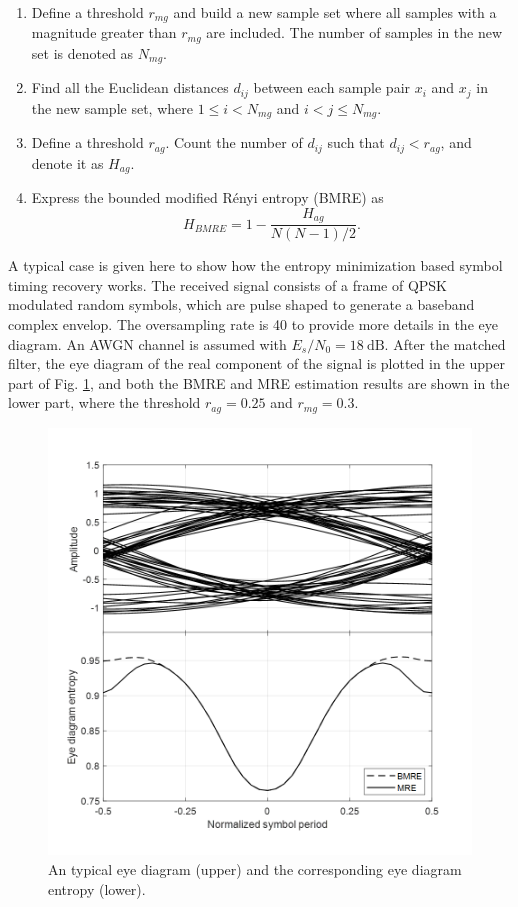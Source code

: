 \documentclass[journal,comsoc]{IEEEtran}
\begin{document}
\begin{enumerate}
\item Define a threshold \(r_{mg}\) and build a new sample set where all samples with a magnitude greater than \(r_{mg}\) are included.
The number of samples in the new set is denoted as \(N_{mg}\).
\item Find all the Euclidean distances \(d_{ij}\) between each sample pair \(x_i\) and \(x_j\) in the new sample set, where \(1\le i<N_{mg}\) and \( i<j \le N_{mg}\). 
\item Define a threshold \(r_{ag}\). Count the number of \(d_{ij}\) such that $d_{ij}<r_{ag}$, and denote it as $H_{ag}$.
\item Express the bounded modified R\'enyi entropy (BMRE) as
\begin{equation}
H_{BMRE}= 1- \frac{ H_{ag}}{ N(N-1)/2}.
\label{eq:entorpy_ad2}
\end{equation}
\end{enumerate}



A typical case is given here to show how the entropy minimization based symbol timing recovery works.
The received signal consists of a frame of QPSK modulated random symbols, 
which are pulse shaped to generate a baseband complex envelop.
The oversampling rate is 40 to provide more details in the eye diagram.
An AWGN channel is assumed with $E_s/N_0 = 18~\text{dB}$. 
After the matched filter, the eye diagram of the real component of the signal is plotted in the upper part of Fig. \ref{fig:timing}, and both the BMRE and MRE estimation results are shown in the lower part,
where the threshold $r_{ag}=0.25$ and \(r_{mg}=0.3\).


\begin{figure}[htbp]
\centering
\includegraphics[width=3 in]{pic/timing.png}
\caption{An typical eye diagram (upper) and the corresponding eye diagram entropy (lower).}
\label{fig:timing} 
\end{figure}
\end{document}
